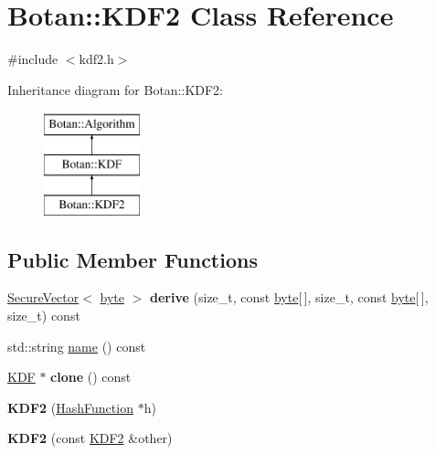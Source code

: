 \hypertarget{classBotan_1_1KDF2}{\section{Botan\-:\-:K\-D\-F2 Class Reference}
\label{classBotan_1_1KDF2}
}


{\ttfamily \#include $<$kdf2.\-h$>$}

Inheritance diagram for Botan\-:\-:K\-D\-F2\-:\begin{figure}[H]
\begin{center}
\leavevmode
\includegraphics[height=3.000000cm]{classBotan_1_1KDF2}
\end{center}
\end{figure}
\subsection*{Public Member Functions}
\begin{DoxyCompactItemize}
\item 
\hypertarget{classBotan_1_1KDF2_a235718192420d85b3659b710c89d646b}{\hyperlink{classBotan_1_1SecureVector}{Secure\-Vector}$<$ \hyperlink{namespaceBotan_a7d793989d801281df48c6b19616b8b84}{byte} $>$ {\bfseries derive} (size\-\_\-t, const \hyperlink{namespaceBotan_a7d793989d801281df48c6b19616b8b84}{byte}\mbox{[}$\,$\mbox{]}, size\-\_\-t, const \hyperlink{namespaceBotan_a7d793989d801281df48c6b19616b8b84}{byte}\mbox{[}$\,$\mbox{]}, size\-\_\-t) const }\label{classBotan_1_1KDF2_a235718192420d85b3659b710c89d646b}

\item 
std\-::string \hyperlink{classBotan_1_1KDF2_a1d0227ba537279cebc1f17ece7a28713}{name} () const 
\item 
\hypertarget{classBotan_1_1KDF2_a99b7d6b79f637d694543469170e75307}{\hyperlink{classBotan_1_1KDF}{K\-D\-F} $\ast$ {\bfseries clone} () const }\label{classBotan_1_1KDF2_a99b7d6b79f637d694543469170e75307}

\item 
\hypertarget{classBotan_1_1KDF2_ae9c0c00d981e4350ab6d9735f60b3d63}{{\bfseries K\-D\-F2} (\hyperlink{classBotan_1_1HashFunction}{Hash\-Function} $\ast$h)}\label{classBotan_1_1KDF2_ae9c0c00d981e4350ab6d9735f60b3d63}

\item 
\hypertarget{classBotan_1_1KDF2_af72f85cb7ec7087c625a6cb12a480714}{{\bfseries K\-D\-F2} (const \hyperlink{classBotan_1_1KDF2}{K\-D\-F2} \&other)}\label{classBotan_1_1KDF2_af72f85cb7ec7087c625a6cb12a480714}

\end{DoxyCompactItemize}


